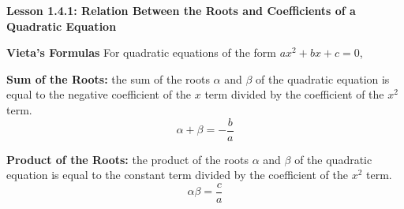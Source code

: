 \begin{center}
\textbf{Lesson 1.4.1: Relation Between the Roots and Coefficients of a Quadratic Equation}
\end{center}


\noindent\textbf{Vieta's Formulas} For quadratic equations of the form $ ax^2 + bx + c = 0 $, 

\textbf{Sum of the Roots:} the sum of the roots $\alpha$ and $\beta$ of the quadratic equation is equal to the negative coefficient of the $x$ term divided by the coefficient of the $x^2$ term. 
$$\alpha + \beta = -\frac{b}{a}$$

\textbf{Product of the Roots:} the product of the roots $\alpha$ and $\beta$ of the quadratic equation is equal to the constant term divided by the coefficient of the $x^2$ term. $$\alpha \beta = \frac{c}{a}$$

